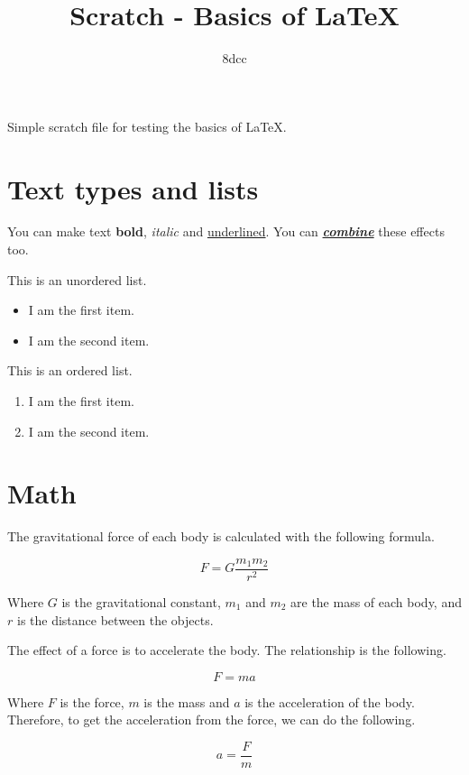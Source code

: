 \documentclass{article}
\title{Scratch - Basics of \LaTeX}
\author{8dcc}
\date{}
\begin{document}
\maketitle

Simple scratch file for testing the basics of \LaTeX.

\section{Text types and lists}

You can make text \textbf{bold}, \textit{italic} and \underline{underlined}.
You can \underline{\textbf{\textit{combine}}} these effects too.

This is an unordered list.

\begin{itemize}
  \item I am the first item.
  \item I am the second item.
\end{itemize}

This is an ordered list.

\begin{enumerate}
  \item I am the first item.
  \item I am the second item.
\end{enumerate}

\section{Math}

The gravitational force of each body is calculated with the following formula.

\begin{displaymath}
    F = G \frac{m_1m_2}{r^2}
\end{displaymath}

Where \(G\) is the gravitational constant, \(m_1\) and \(m_2\) are the mass of
each body, and \(r\) is the distance between the objects.

The effect of a force is to accelerate the body. The relationship is the
following.

\begin{displaymath}
   F = m a
\end{displaymath}

Where \(F\) is the force, \(m\) is the mass and \(a\) is the acceleration of
the body. Therefore, to get the acceleration from the force, we can do the
following.

\begin{displaymath}
    a = \frac{F}{m}
\end{displaymath}
\end{document}
